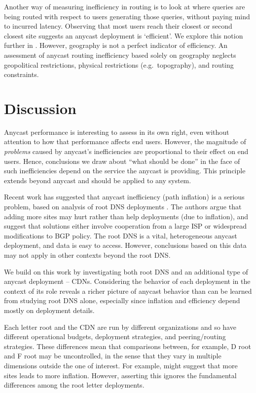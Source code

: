 \documentclass[sigconf,letterpaper,nonacm,10pt,anonymous]{acmart}
\begin{document}
Another way of measuring inefficiency in routing is to look at where
queries are being routed with respect to users generating those queries,
without paying mind to incurred latency. Observing that most users reach
their closest or second closest site suggests an anycast deployment is
`efficient'. We explore this notion further in .
However, geography is not a perfect indicator of efficiency. An
assessment of anycast routing inefficiency based solely on geography
neglects geopolitical restrictions, physical restrictions
(e.g.~topography), and routing constraints.

\section{Discussion}\label{discussion}

\label{sec:discussion}

Anycast performance is interesting to assess in its own right, even
without attention to how that performance affects end users. However,
the magnitude of \emph{problems} caused by anycast's inefficiencies are
proportional to their effect on end users. Hence, conclusions we draw
about ``what should be done'' in the face of such inefficiencies depend
on the service the anycast is providing. This principle extends beyond
anycast and should be applied to any system.

Recent work has suggested that anycast inefficiency (path inflation) is
a serious problem, based on analysis of root DNS deployments
\cite{li_levin_spring_bhattacharjee_2018}. The authors argue that adding
more sites may hurt rather than help deployments (due to inflation), and
suggest that solutions either involve cooperation from a large ISP or
widespread modifications to BGP policy. The root DNS is a vital,
heterogeneous anycast deployment, and data is easy to access. However,
conclusions based on this data may not apply in other contexts beyond
the root DNS.

We build on this work by investigating both root DNS and an additional
type of anycast deployment -- CDNs. Considering the behavior of each
deployment in the context of its role reveals a richer picture of
anycast behavior than can be learned from studying root DNS alone,
especially since inflation and efficiency depend mostly on deployment
details.

Each letter root and the CDN are run by different organizations and so
have different operational budgets, deployment strategies, and
peering/routing strategies. These differences mean that comparisons
between, for example, D root and F root may be uncontrolled, in the
sense that they vary in multiple dimensions outside the one of interest.
For example,  might suggest that more sites
leads to more inflation. However, asserting this ignores the fundamental
differences among the root letter deployments.
\end{document}
